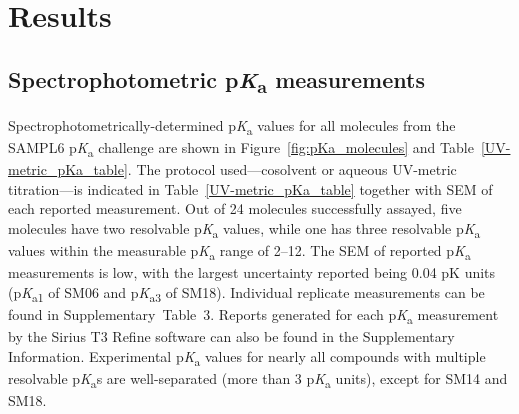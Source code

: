 \documentclass[9pt,lineno]{elife}
\newcommand{\pKa}{p\textit{K}\textsubscript{a}}
\begin{document}
\section{Results}

\subsection{Spectrophotometric \pKa{} measurements}

Spectrophotometrically-determined \pKa{} values for all molecules from the SAMPL6 \pKa{} challenge are shown in Figure~\ref{fig:pKa_molecules} and Table~\ref{UV-metric_pKa_table}. 
The protocol used---cosolvent or aqueous UV-metric titration---is indicated in Table~\ref{UV-metric_pKa_table} together with SEM of each reported measurement. 
Out of 24 molecules successfully assayed, five molecules have two resolvable \pKa{} values, while one has three resolvable \pKa{} values within the measurable \pKa{} range of 2--12. 
The SEM of reported \pKa{} measurements is low, with the largest uncertainty reported being 0.04 pK units (\pKa \textsubscript{1} of SM06 and \pKa \textsubscript{3} of SM18). 
Individual replicate measurements can be found in Supplementary~Table~3. 
Reports generated for each \pKa{} measurement by the Sirius T3 Refine software can also be found in the Supplementary Information. 
Experimental \pKa{} values for nearly all compounds with multiple resolvable \pKa s are well-separated (more than 3 \pKa{} units), except for SM14 and SM18.
\end{document}
